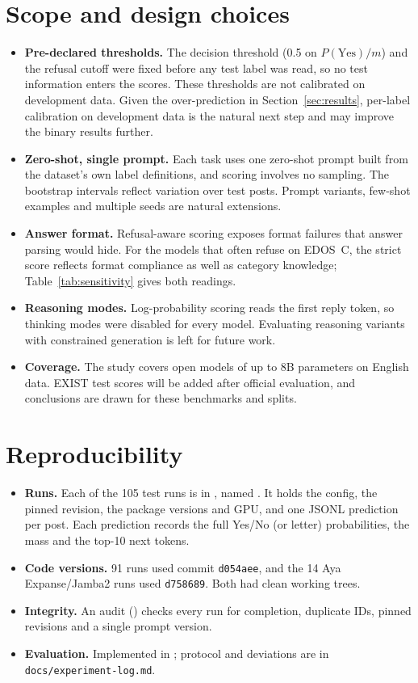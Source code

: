 \documentclass[11pt]{article}
\begin{document}
\section{Scope and design choices}\label{sec:limits}
\begin{itemize}
  \item \textbf{Pre-declared thresholds.} The decision threshold (0.5 on $P(\text{Yes})/m$) and the refusal cutoff were fixed before any test label was read, so no test information enters the scores. These thresholds are not calibrated on development data. Given the over-prediction in Section~\ref{sec:results}, per-label calibration on development data is the natural next step and may improve the binary results further.
  \item \textbf{Zero-shot, single prompt.} Each task uses one zero-shot prompt built from the dataset's own label definitions, and scoring involves no sampling. The bootstrap intervals reflect variation over test posts. Prompt variants, few-shot examples and multiple seeds are natural extensions.
  \item \textbf{Answer format.} Refusal-aware scoring exposes format failures that answer parsing would hide. For the models that often refuse on EDOS~C, the strict score reflects format compliance as well as category knowledge; Table~\ref{tab:sensitivity} gives both readings.
  \item \textbf{Reasoning modes.} Log-probability scoring reads the first reply token, so thinking modes were disabled for every model. Evaluating reasoning variants with constrained generation is left for future work.
  \item \textbf{Coverage.} The study covers open models of up to 8B parameters on English data. EXIST test scores will be added after official evaluation, and conclusions are drawn for these benchmarks and splits.
\end{itemize}

\section{Reproducibility}
\begin{itemize}
  \item \textbf{Runs.} Each of the 105 test runs is in , named . It holds the config, the pinned revision, the package versions and GPU, and one JSONL prediction per post. Each prediction records the full Yes/No (or letter) probabilities, the mass and the top-10 next tokens.
  \item \textbf{Code versions.} 91 runs used commit \texttt{d054aee}, and the 14 Aya Expanse/Jamba2 runs used \texttt{d758689}. Both had clean working trees.
  \item \textbf{Integrity.} An audit () checks every run for completion, duplicate IDs, pinned revisions and a single prompt version.
  \item \textbf{Evaluation.} Implemented in ; protocol and deviations are in \texttt{docs/experiment-log.md}.
\end{itemize}
\end{document}
